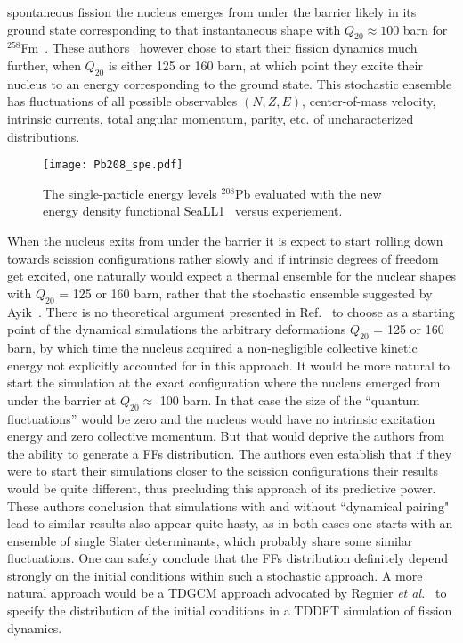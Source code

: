 \documentclass{webofc}
\begin{document}
spontaneous fission  the nucleus emerges from under the barrier likely in its
ground state corresponding to that instantaneous shape with $Q_{20}\approx 100$ barn for
$^{258}$Fm~\cite{Tanimura}. These authors~\cite{Tanimura}  however
chose to start their fission dynamics much further, when $Q_{20}$ is either 125 or 160 barn,
at which point they excite their nucleus to an energy
corresponding to the ground state. This stochastic ensemble has
fluctuations of all possible observables $(N, Z, E)$, center-of-mass velocity,
intrinsic currents, total angular momentum, parity, etc. of uncharacterized distributions.
\begin{wrapfigure}{r}{0.57\textwidth}
\texttt{[image: Pb208\_spe.pdf]}
\caption{ \label{fig:ab6}   The single-particle energy levels  $^{208}$Pb evaluated with
the new energy density functional SeaLL1~\cite{NEDF} versus experiement.}
\end{wrapfigure}
When the nucleus exits from under the barrier
it is expect to start rolling down towards scission configurations rather slowly and if
intrinsic degrees of freedom get excited, one naturally would expect a thermal
ensemble for the nuclear shapes with $Q_{20}$ = 125 or 160 barn,
rather that the stochastic ensemble suggested by Ayik~\cite{Ayik}.
There is no theoretical argument presented in Ref.~\cite{Tanimura} to choose as a starting point
of the dynamical simulations the arbitrary deformations  $Q_{20}$ = 125 or
160 barn, by which time the nucleus acquired a non-negligible collective
kinetic energy not explicitly accounted for in this approach. It would
be more natural to start the simulation at the exact
configuration where the nucleus emerged from under the barrier
at $Q_{20}\approx$ 100 barn. In that case the size of the ``quantum
fluctuations'' would be zero and the nucleus would have no intrinsic
excitation energy and zero collective momentum.
But that would deprive the authors from the ability to generate
a FFs distribution. The authors even establish that if they were to start their simulations closer to
the scission configurations their results would be quite different, thus precluding this approach
of its predictive power.  These authors conclusion that simulations with and without ``dynamical pairing"
lead to similar results also appear quite hasty, as in both cases one starts with
an ensemble of single Slater determinants, which probably share some
similar fluctuations. One can safely conclude that the FFs
distribution definitely depend strongly  on the initial conditions within such a stochastic
approach. A more natural approach would be a TDGCM approach advocated by
Regnier {\it et al.}~\cite{Regnier} to specify the distribution of the
initial conditions in a TDDFT simulation of fission dynamics.
\end{document}
